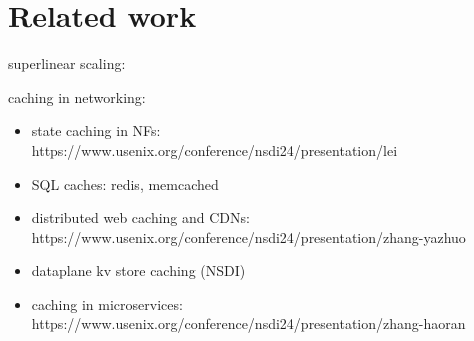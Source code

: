 \section{Related work}
\label{sec:related-work}

superlinear scaling:

%


%



%

%



caching in networking:
\begin{itemize}
\item state caching in NFs: https://www.usenix.org/conference/nsdi24/presentation/lei
\item SQL caches: redis, memcached
\item distributed web caching and CDNs: https://www.usenix.org/conference/nsdi24/presentation/zhang-yazhuo
\item dataplane kv store caching (NSDI)
\item caching in microservices: https://www.usenix.org/conference/nsdi24/presentation/zhang-haoran
\end{itemize}

